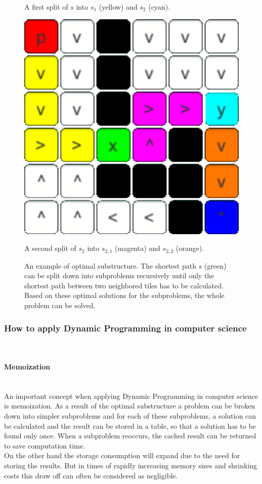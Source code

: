 \documentclass[conference]{IEEEtran}
\begin{document}
\begin{figure}[h]
\begin{minipage}[t]{0.3\linewidth}
\caption{A first split of $s$ into $s_1$ (yellow) and $s_2$ (cyan).}
\end{minipage}
\hfill
\begin{minipage}[t]{0.3\linewidth}
\centering
\includegraphics[width=1\textwidth]{images/OptimalSubstructure/second.png}
\caption{A second split of $s_2$ into $s_{2,1}$ (magenta) and $s_{2,2}$ (orange).}
\end{minipage}
\caption{An example of optimal substructure. The shortest path $s$ (green) can be split down into subproblems recursively until only the shortest path between two neighbored tiles has to be calculated. Based on these optimal solutions for the subproblems, the whole problem can be solved.}
\end{figure}

\subsubsection{How to apply Dynamic Programming in computer science}
\quad \\
\paragraph{Memoization}
\quad \\
An important concept when applying Dynamic Programming in computer science is memoization. As a result of the optimal substructure a problem can be broken down into simpler subproblems and for each of these subproblems, a solution can be calculated and the result can be stored in a table, so that a solution has to be found only once. When a subproblem reoccurs, the cached result can be returned to save computation time. \\
On the other hand the storage consumption will expand due to the need for storing the results. But in times of rapidly increasing memory sizes and shrinking costs this draw off can often be considered as negligible.
\\
\end{document}
